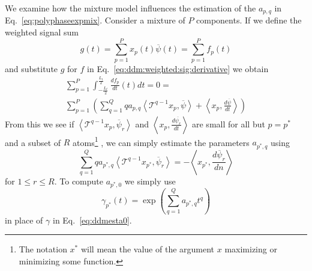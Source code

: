\documentclass[twoside,a4paper]{article}
\begin{document}
We examine how the mixture model influences the estimation of the $a_{p,q}$ in
Eq.~\ref{eq:polyphaseexpmix}.
Consider a mixture of $P$ components.
If we define the weighted signal sum
%
\begin{equation}
    g(t) = \sum_{p=1}^{P} x_{p}(t) \overline{\psi}(t) = \sum_{p=1}^{P} f_{p}(t)
\end{equation}
%
and substitute $g$ for $f$ in Eq.~\ref{eq:ddm:weighted:sig:derivative} we obtain
%
\begin{multline}
    \label{eq:mixest}
    \sum_{p=1}^{P} \int_{-\frac{L_{t}}{2}}^{\frac{L_{t}}{2}}
    \frac{df_{p}}{dt}(t)dt =
    0
    = \\ 
    \sum_{p=1}^{P} \left(
    \sum_{q=1}^{Q} q a_{p,q} 
    \left\langle \mathcal{T}^{q-1} x_{p} , \overline{\psi} \right\rangle
    + \left\langle x_{p}, \frac{d\overline{\psi}}{dt} \right\rangle \right)
\end{multline}
%
From this we see if $\left\langle \mathcal{T}^{q-1} x_{p} , \overline{\psi}_{r}
\right\rangle$ and $\left\langle x_{p}, \frac{d\overline{\psi_{r}}}{dt} \right\rangle$
are small for all but $p = p^{\ast}$ and a subset of $R$ atoms\footnote{%
The notation $x^{\ast}$ will mean the value of the argument $x$ maximizing or minimizing some
function.
}%
, we can simply estimate the parameters $a_{p^{\ast},q}$ using
\begin{equation}
    \sum_{q=1}^{Q} q a_{{p^{\ast}},q} 
    \left\langle \mathcal{T}^{q-1} x_{p^{\ast}} , \overline{\psi}_{r} \right\rangle
    = -\left\langle x_{p^{\ast}}, \frac{d\overline{\psi}_{r}}{dn} \right\rangle
\end{equation}
for $1 \leq r \leq R$. To compute $a_{p^{\ast},0}$ we simply use
\begin{equation}
    \gamma_{p^{\ast}}(t) = \exp \left( \sum_{q=1}^{Q} a_{p^{\ast},q} t^{q} \right)
\end{equation}
in place of $\gamma$ in Eq.~\ref{eq:ddmesta0}.
\end{document}
